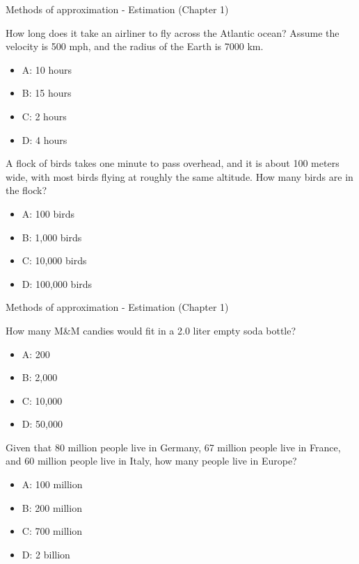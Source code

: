 \documentclass{beamer}
\begin{document}
\begin{frame}{Methods of approximation - Estimation (Chapter 1)}
\small
\begin{minipage}[b]{0.45\linewidth}
How long does it take an airliner to fly across the Atlantic ocean?  Assume the velocity is 500 mph, and the radius of the Earth is 7000 km.
\vspace{0.6cm}
\begin{itemize}
\item A: 10 hours
\item B: 15 hours
\item C: 2 hours
\item D: 4 hours
\end{itemize}
\end{minipage}
\hspace{0.5cm}
\begin{minipage}[b]{0.45\linewidth}
A flock of birds takes one minute to pass overhead, and it is about 100 meters wide, with most birds flying at roughly the same altitude.  How many birds are in the flock?
\vspace{0.1cm}
\begin{itemize}
\item A: 100 birds
\item B: 1,000 birds
\item C: 10,000 birds
\item D: 100,000 birds
\end{itemize}
\end{minipage}
\end{frame}

\begin{frame}{Methods of approximation - Estimation (Chapter 1)}
\small
\begin{minipage}[b]{0.45\linewidth}
How many M\&M candies would fit in a 2.0 liter empty soda bottle?
\vspace{0.6cm}
\begin{itemize}
\item A: 200
\item B: 2,000
\item C: 10,000
\item D: 50,000
\end{itemize}
\end{minipage}
\hspace{0.5cm}
\begin{minipage}[b]{0.45\linewidth}
Given that 80 million people live in Germany, 67 million people live in France, and 60 million people live in Italy, how many people live in Europe?
\vspace{0.1cm}
\begin{itemize}
\item A: 100 million
\item B: 200 million
\item C: 700 million
\item D: 2 billion
\end{itemize}
\end{minipage}
\end{frame}
\end{document}
